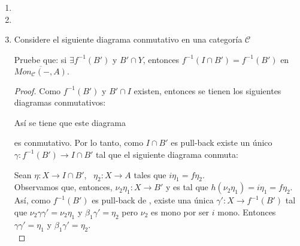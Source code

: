 \documentclass{article}
\begin{document}
\begin{enumerate}[label=\textbf{Ej \arabic*.}]
\begin{proof}
\end{proof}


\item

\item

\item Considere el siguiente diagrama conmutativo en una categoría $\mathscr{C}$

\centerline{
}
Pruebe que: si $\exists f^{-1}(B')$ y $B'\cap Y$, entonces $f^{-1}(I\cap B')= f^{-1}(B')$ en $\overline{Mon_{\mathscr{C}}(-,A)}.$ 

\begin{proof}
Como $f^{-1}(B')$ y $B'\cap I$ existen, entonces se tienen los siguientes diagramas conmutativos:\\

\centerline{
}
Así se tiene que este diagrama

\centerline{
}
es conmutativo. Por lo tanto, como $I\cap B'$ es pull-back existe un único $ \gamma: f^{-1}(B')\to I\cap B'$ tal que el siguiente diagrama conmuta:\\

\centerline{
}

Sean $\eta: X\to I\cap B'$, \, $\eta_2: X\to A$ tales que $i\eta_1=f\eta_2$.\\

Observamos que, entonces, $\nu_2\eta_1 : X\to B'$ y es tal que $h(\nu_2\eta_1)=i\eta_1=f\eta_2$.\\

Así, como $f^{-1}(B')$ es pull-back de , existe una única $\gamma' : X\to f^{-1}(B')$ tal que 
$\nu_2\gamma\gamma'=\nu_2\eta_1$ y $\beta_1\gamma'=\eta_2$ pero $\nu_2$ es mono por ser $i$ mono. Entonces 
$\gamma\gamma'=\eta_1$ y $\beta_1\gamma'=\eta_2$.\\


\end{proof}
\end{enumerate}
\end{document}
